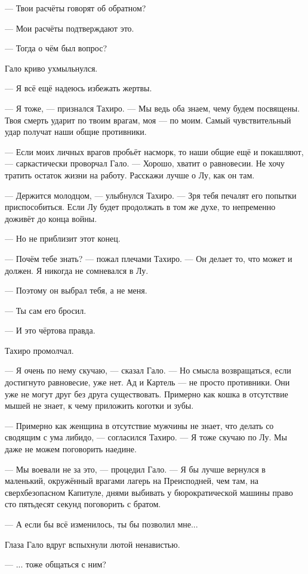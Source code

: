 --- Твои расчёты говорят об обратном?

--- Мои расчёты подтверждают это.

--- Тогда о чём был вопрос?

Гало криво ухмыльнулся.

--- Я всё ещё надеюсь избежать жертвы.

--- Я тоже, --- признался Тахиро.
--- Мы ведь оба знаем, чему будем посвящены.
Твоя смерть ударит по твоим врагам, моя --- по моим.
Самый чувствительный удар получат наши общие противники.

--- Если моих личных врагов пробьёт насморк, то наши общие ещё и покашляют, --- саркастически проворчал Гало.
--- Хорошо, хватит о равновесии.
Не хочу тратить остаток жизни на работу.
Расскажи лучше о Лу, как он там.

--- Держится молодцом, --- улыбнулся Тахиро.
--- Зря тебя печалят его попытки приспособиться.
Если Лу будет продолжать в том же духе, то непременно доживёт до конца войны.

--- Но не приблизит этот конец.

--- Почём тебе знать? --- пожал плечами Тахиро.
--- Он делает то, что может и должен.
Я никогда не сомневался в Лу.

--- Поэтому он выбрал тебя, а не меня.

--- Ты сам его бросил.

--- И это чёртова правда.

Тахиро промолчал.

--- Я очень по нему скучаю, --- сказал Гало.
--- Но смысла возвращаться, если достигнуто равновесие, уже нет.
Ад и Картель --- не просто противники.
Они уже не могут друг без друга существовать.
Примерно как кошка в отсутствие мышей не знает, к чему приложить коготки и зубы.

--- Примерно как женщина в отсутствие мужчины не знает, что делать со сводящим с ума либидо, --- согласился Тахиро.
--- Я тоже скучаю по Лу.
Мы даже не можем поговорить наедине.

--- Мы воевали не за это, --- процедил Гало.
--- Я бы лучше вернулся в маленький, окружённый врагами лагерь на Преисподней, чем там, на сверхбезопасном Капитуле, днями выбивать у бюрократической машины право сто пятьдесят секунд поговорить с братом.

--- А если бы всё изменилось, ты бы позволил мне...

Глаза Гало вдруг вспыхнули лютой ненавистью.

--- ... тоже общаться с ним?

